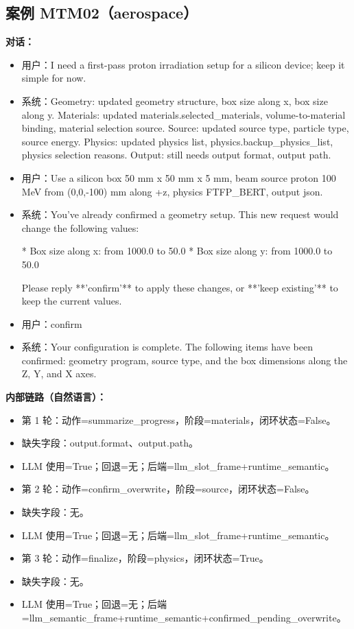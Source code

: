 \documentclass[11pt]{ctexart}
\begin{document}
\subsection{案例 MTM02（aerospace）}
\textbf{对话：}
\begin{itemize}
\item 用户：I need a first-pass proton irradiation setup for a silicon device; keep it simple for now.
\item 系统：Geometry: updated geometry structure, box size along x, box size along y. Materials: updated materials.selected\_materials, volume-to-material binding, material selection source. Source: updated source type, particle type, source energy. Physics: updated physics list, physics.backup\_physics\_list, physics selection reasons. Output: still needs output format, output path.
\item 用户：Use a silicon box 50 mm x 50 mm x 5 mm, beam source proton 100 MeV from (0,0,-100) mm along +z, physics FTFP\_BERT, output json.
\item 系统：You've already confirmed a geometry setup. This new request would change the following values:

*   Box size along x: from 1000.0 to 50.0
*   Box size along y: from 1000.0 to 50.0

Please reply **'confirm'** to apply these changes, or **'keep existing'** to keep the current values.
\item 用户：confirm
\item 系统：Your configuration is complete. The following items have been confirmed: geometry program, source type, and the box dimensions along the Z, Y, and X axes.
\end{itemize}
\textbf{内部链路（自然语言）：}
\begin{itemize}
\item 第 1 轮：动作=summarize\_progress，阶段=materials，闭环状态=False。
\item 缺失字段：output.format、output.path。
\item LLM 使用=True；回退=无；后端=llm\_slot\_frame+runtime\_semantic。
\item 第 2 轮：动作=confirm\_overwrite，阶段=source，闭环状态=False。
\item 缺失字段：无。
\item LLM 使用=True；回退=无；后端=llm\_slot\_frame+runtime\_semantic。
\item 第 3 轮：动作=finalize，阶段=physics，闭环状态=True。
\item 缺失字段：无。
\item LLM 使用=True；回退=无；后端=llm\_semantic\_frame+runtime\_semantic+confirmed\_pending\_overwrite。
\end{itemize}
\end{document}

